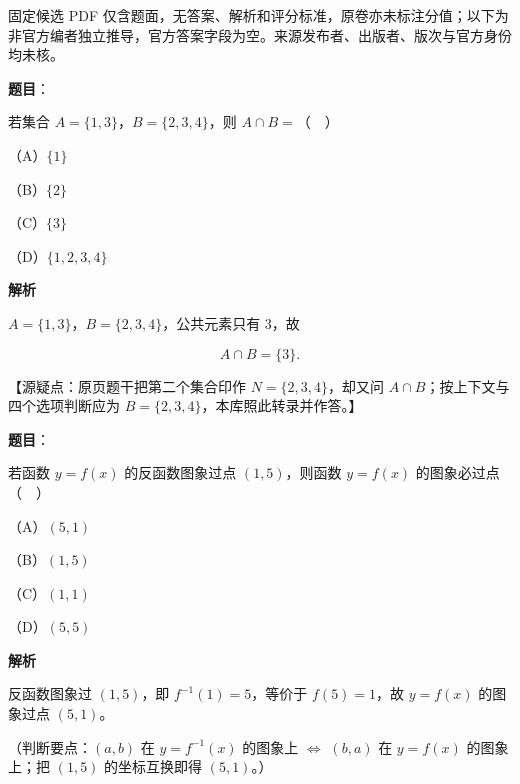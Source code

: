 

\begin{gktip}
固定候选 PDF 仅含题面，无答案、解析和评分标准，原卷亦未标注分值；以下为非官方编者独立推导，官方答案字段为空。来源发布者、出版者、版次与官方身份均未核。
\end{gktip}

\begin{answer}

\textbf{题目}：

若集合 $A=\{1,3\}$，$B=\{2,3,4\}$，则 $A\cap B=$（　）

（A）$\{1\}$

（B）$\{2\}$

（C）$\{3\}$

（D）$\{1,2,3,4\}$

\textbf{解析}

$A=\{1,3\}$，$B=\{2,3,4\}$，公共元素只有 $3$，故

\nopagebreak[4]
\[A\cap B=\{3\}.\]

【源疑点：原页题干把第二个集合印作 $N=\{2,3,4\}$，却又问 $A\cap B$；按上下文与四个选项判断应为 $B=\{2,3,4\}$，本库照此转录并作答。】


\end{answer}
\begin{answer}

\textbf{题目}：

若函数 $y=f(x)$ 的反函数图象过点 $(1,5)$，则函数 $y=f(x)$ 的图象必过点（　）

（A）$(5,1)$

（B）$(1,5)$

（C）$(1,1)$

（D）$(5,5)$

\textbf{解析}

反函数图象过 $(1,5)$，即 $f^{-1}(1)=5$，等价于 $f(5)=1$，故 $y=f(x)$ 的图象过点 $(5,1)$。

（判断要点：$(a,b)$ 在 $y=f^{-1}(x)$ 的图象上 $\Leftrightarrow$ $(b,a)$ 在 $y=f(x)$ 的图象上；把 $(1,5)$ 的坐标互换即得 $(5,1)$。）


\end{answer}
